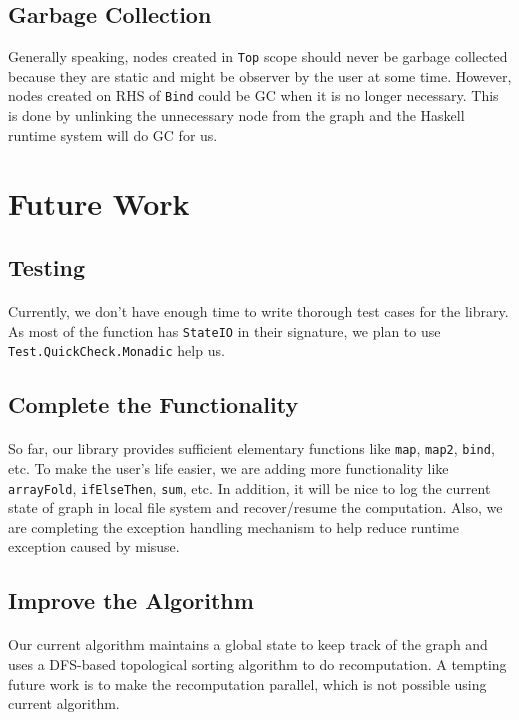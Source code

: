 \documentclass[a4paper, twocolumn]{article}
\newcommand{\code}{\texttt} %
\begin{document}
\subsection{Garbage Collection}
Generally speaking, nodes created in \code{Top} scope should never be garbage collected because they are static and might be observer by the user at some time. However, nodes created on RHS of \code{Bind} could be GC when it is no longer necessary. This is done by unlinking the unnecessary node from the graph and the Haskell runtime system will do GC for us.

\section{Future Work}
\subsection{Testing}
\paragraph{} Currently, we don't have enough time to write thorough test cases for the library. As most of the function has \code{StateIO} in their signature, we plan to use \code{Test.QuickCheck.Monadic} help us.  

\subsection{Complete the Functionality}
\paragraph{} So far, our library provides sufficient elementary functions like \code{map}, \code{map2}, \code{bind}, etc. To make the user's life easier, we are adding more functionality like \code{arrayFold}, \code{ifElseThen}, \code{sum}, etc. In addition, it will be nice to log the current state of graph in local file system and recover/resume the computation. Also, we are completing the exception handling mechanism to help reduce runtime exception caused by misuse. 

\subsection{Improve the Algorithm}
\paragraph{} Our current algorithm maintains a global state to keep track of the graph and uses a DFS-based topological sorting algorithm to do recomputation. A tempting future work is to make the recomputation parallel, which is not possible using current algorithm.




\end{document}
